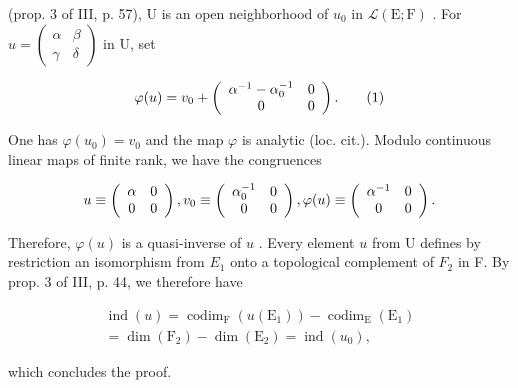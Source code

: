 (prop. 3 of III, p. 57), U is an open neighborhood of \(u_0\) in \(\mathcal{L}(\mathrm{E};\mathrm{F})\) . For \(u = \begin{pmatrix} \alpha & \beta \\ \gamma & \delta \end{pmatrix}\) in U, set

\[
\varphi (u) = v _ {0} + \left( \begin{array}{c c} \alpha^ {- 1} - \alpha_ {0} ^ {- 1} & 0 \\ 0 & 0 \end{array} \right).\tag{1}
\]

One has \(\varphi(u_{0}) = v_{0}\) and the map \(\varphi\) is analytic (loc. cit.). Modulo continuous linear maps of finite rank, we have the congruences

\[
u \equiv \left( \begin{array}{c c} \alpha & 0 \\ 0 & 0 \end{array} \right) , v _ {0} \equiv \left( \begin{array}{c c} \alpha_ {0} ^ {- 1} & 0 \\ 0 & 0 \end{array} \right) , \varphi (u) \equiv \left( \begin{array}{c c} \alpha^ {- 1} & 0 \\ 0 & 0 \end{array} \right).
\]

Therefore, \(\varphi(u)\) is a quasi-inverse of \(u\) . Every element \(u\) from U defines by restriction an isomorphism from \(E _1\) onto a topological complement of \(F _2\) in F. By prop. 3 of III, p. 44, we therefore have

\[
\begin{array}{c} \operatorname{ind} (u) = \operatorname{codim} _ {\mathrm{F}} (u (\mathrm{E} _ {1})) - \operatorname{codim} _ {\mathrm{E}} (\mathrm{E} _ {1}) \\ = \dim (\mathrm{F} _ {2}) - \dim (\mathrm{E} _ {2}) = \operatorname{ind} (u _ {0}), \end{array}
\]

which concludes the proof.